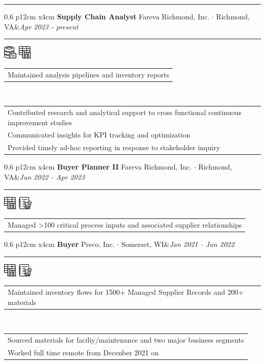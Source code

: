 \documentclass[10pt,A4]{article}
\newcommand{\tzlarrow}{(0,0) -- (0.2,0) -- (0.3,0.2) -- (0.2,0.4) -- (0,0.4) -- (0.1,0.2) -- cycle;}
\newcommand{\larrow}[1]
{\begin{tikzpicture}[scale=0.58]
	 \filldraw[fill=#1!100,draw=#1!100!black]  \tzlarrow
 \end{tikzpicture}
}
\newcommand{\cvevent}[5]
{
\vspace{8pt}
	\begin{tabular*}{0.6\linewidth}{ p{12cm} x{4cm}}
\textbf{#2} \hspace{4pt} {#3}&\textit{#1}\\[4pt]
	\end{tabular*}
        
        \vspace{-10pt}

\textcolor{softcol}{\hrule}
\vspace{-2pt}
\hspace{14.3cm}
#4 \\[-18pt-6pt]
\vspace{6pt}
	\begin{tabular*}{1\textwidth}{l}
	\vspace{-0.85cm} \larrow{sectcol} #5\\[4.5pt]
	\end{tabular*}
}
\newcommand{\cveventshort}[5]
{
\vspace{8pt}
	\begin{tabular*}{0.6\linewidth}{ p{12cm} x{4cm}}
\textbf{#2} \hspace{4pt} {#3}&\textit{#1}\\[4pt]
	\end{tabular*}
        
        \vspace{-10pt}
        
\textcolor{softcol}{\hrule}
\vspace{-2pt}
\hspace{14.3cm}
#4 \\[-18pt-6pt]
\vspace{6pt}
	\begin{tabular*}{1\textwidth}{l}
	\vspace{-0.85cm} \larrow{sectcol} #5\\[6pt]
	\end{tabular*}
\vspace{-3pt}
}
\newcommand{\oneextra}[1]
{ \vspace{-0.85cm+24pt} \\
\begin{tabular*}{1\textwidth}{l}
		 \larrow{softcol}  #1\\[6pt]
	\end{tabular*}
\vspace{-3pt}
}
\newcommand{\twoextra}[2]
{ \vspace{-0.85cm+24pt} \\
\begin{tabular*}{1\textwidth}{l}
		 \larrow{softcol}  #1\\[4.5pt]
		 \larrow{softcol}  #2\\[6pt]
	\end{tabular*}
\vspace{-3pt}
}
\newcommand{\threeextra}[3]
{ \vspace{-0.85cm+24pt} \\
\begin{tabular*}{1\textwidth}{l}
		 \larrow{softcol}  #1\\[4.5pt]
		 \larrow{softcol}  #2\\[4.5pt]
		 \larrow{softcol}  #3\\[6pt]
	\end{tabular*}
\vspace{-3pt}
}
\begin{document}
\begin{minipage}[c][0.5\textheight][t]{\linewidth}
\vspace{3.3cm}
  \hspace{18.5cm}
\textcolor{sectcol}{\rule[-3.4cm]{2pt}{7.2cm}}
\hspace{12pt}

\vspace{-9.8cm}
\hspace{26pt}
\parbox[c]{0.8\linewidth}{
%
  \cvevent{Apr 2023 - present}{Supply Chain Analyst}{Fareva Richmond, Inc.  $\cdot$  Richmond, VA}
   {\hspace{22.2222pt}\includegraphics[height=18pt]{img/DBgraphic} \hspace{2pt} \includegraphics[height=18pt]{img/chartgraphic}}
{Maintained analysis pipelines and inventory reports}
\threeextra{Contributed research and analytical support to cross functional continuous improvement studies}{Communicated insights for KPI tracking and optimization}{Provided timely ad-hoc reporting in response to stakeholder inquiry}


%
  \cveventshort{Jun 2022 - Apr 2023}{Buyer Planner II}{Fareva Richmond, Inc.  $\cdot$  Richmond, VA}
{ \hspace{20.2222pt} \includegraphics[height=18pt]{img/chartgraphic} \hspace{2pt} \includegraphics[height=18pt]{img/notebookgraphic}}
{Managed >100 critical process inputs and associated supplier relationships}



%
  \cvevent{Jan 2021 - Jun 2022}{Buyer}{Preco, Inc.  $\cdot$  Somerset, WI}
{ \hspace{20.2222pt} \includegraphics[height=18pt]{img/chartgraphic} \hspace{2pt} \includegraphics[height=18pt]{img/notebookgraphic}}
{Maintained inventory flows for 1500+ Managed Supplier Records and 200+ materials}
  \twoextra{Sourced materials for faciliy/maintenance and two major business segments}{Worked full time remote from Decenber 2021 on}

}
\end{minipage}
\end{document}
